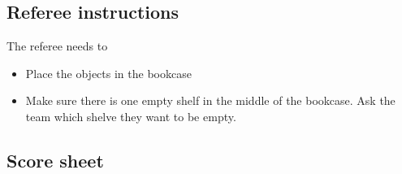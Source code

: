 \subsection{Referee instructions}

The referee needs to
\begin{itemize}
\item Place the objects in the bookcase
\item Make sure there is one empty shelf in the middle of the bookcase. Ask the team which shelve they want to be empty.
\end{itemize}

\subsection{Score sheet}


